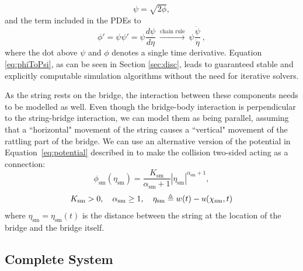     \begin{equation}
        \psi = \sqrt{2\phi},
    \end{equation}
    and the term included in the PDEs to
    \begin{equation}\label{eq:phiToPsi}
        \phi' = \psi\psi' = \psi\frac{d\psi}{d\eta}\  \xrightarrow{\text{chain rule}}\ \psi\frac{\dot \psi}{\dot \eta}\ ,
    \end{equation}
    where the dot above $\psi$ and $\phi$ denotes a single time derivative. Equation \eqref{eq:phiToPsi}, as can be seen in Section \ref{sec:disc}, leads to guaranteed stable and explicitly computable simulation algorithms without the need for iterative solvers. 
    
    As the string rests on the bridge, the interaction between these components needs to be modelled as well. Even though the bridge-body interaction is perpendicular to the string-bridge interaction, we can model them as being parallel, assuming that a ``horizontal" movement of the string causes a ``vertical" movement of the rattling part of the bridge. We can use an alternative version of the potential in Equation~\eqref{eq:potential} described in \cite{Bilbao2019} to make the collision two-sided acting as a connection:
    \begin{equation}\label{eq:phiConnection}
        \phi_\text{sm}(\eta_\text{sm}) = \frac{K_\text{sm}}{\alpha_\text{sm}+1}|\eta_\text{sm}|^{\alpha_\text{sm}+1},
    \end{equation}
    \begin{equation*}
        K_\text{sm}>0, \quad \alpha_\text{sm}\geq 1, \quad \eta_\text{sm}\triangleq w(t) - u(\chi_\text{sm},t)
    \end{equation*}
    where $\eta_\text{sm} = \eta_\text{sm}(t)$ is the distance between the string at the location of the bridge and the bridge itself. 
    
    \subsection{Complete System}
    
